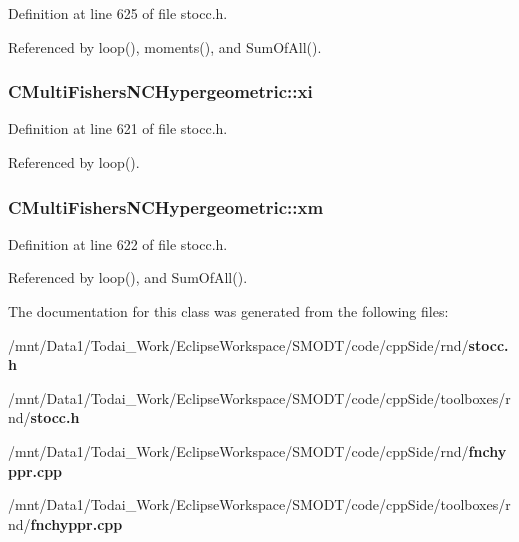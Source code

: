 Definition at line 625 of file stocc.\-h.



Referenced by loop(), moments(), and Sum\-Of\-All().

\subsubsection[{xi}]{ C\-Multi\-Fishers\-N\-C\-Hypergeometric\-::xi\hspace{0.3cm}{\ttfamily [protected]}}\label{class_c_multi_fishers_n_c_hypergeometric_a23d898d3b688be52155f9de80dd5da8b}


Definition at line 621 of file stocc.\-h.



Referenced by loop().

\subsubsection[{xm}]{ C\-Multi\-Fishers\-N\-C\-Hypergeometric\-::xm\hspace{0.3cm}{\ttfamily [protected]}}\label{class_c_multi_fishers_n_c_hypergeometric_aa58081ebff0e6e273abd70f36aebc58c}


Definition at line 622 of file stocc.\-h.



Referenced by loop(), and Sum\-Of\-All().



The documentation for this class was generated from the following files\-:\begin{DoxyCompactItemize}
\item 
/mnt/\-Data1/\-Todai\-\_\-\-Work/\-Eclipse\-Workspace/\-S\-M\-O\-D\-T/code/cpp\-Side/rnd/{\bf stocc.\-h}\item 
/mnt/\-Data1/\-Todai\-\_\-\-Work/\-Eclipse\-Workspace/\-S\-M\-O\-D\-T/code/cpp\-Side/toolboxes/rnd/{\bf stocc.\-h}\item 
/mnt/\-Data1/\-Todai\-\_\-\-Work/\-Eclipse\-Workspace/\-S\-M\-O\-D\-T/code/cpp\-Side/rnd/{\bf fnchyppr.\-cpp}\item 
/mnt/\-Data1/\-Todai\-\_\-\-Work/\-Eclipse\-Workspace/\-S\-M\-O\-D\-T/code/cpp\-Side/toolboxes/rnd/{\bf fnchyppr.\-cpp}\end{DoxyCompactItemize}
